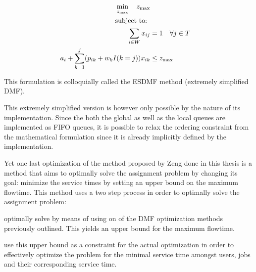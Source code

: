 \documentclass{seal_thesis}
\begin{document}
\begin{align}
    \min_{z_{\text{max}}} \quad z_{\text{max}}\\
    \text{subject to: } \notag \\
    \sum_{i \in W} x_{ij} &= 1 \quad \forall j \in T\\
    a_i + \sum_{k=1}^j (p_{ik} + w_k I(k=j))x_{ik} &\leq z_{\text{max}}
\end{align}

This formulation is colloquially called the ESDMF method (extremely simplified DMF).

This extremely simplified version is however only possible by the nature of its implementation. Since the both the global as well as the local queues are implemented as FIFO queues, it is possible to relax the ordering constraint from the mathematical formulation since it is already implicitly defined by the implementation.

Yet one last optimization of the method proposed by Zeng done in this thesis is a method that aims to optimally solve the assignment problem by changing its goal: minimize the service times by setting an upper bound on the maximum flowtime. This method uses a two step process in order to optimally solve the assignment problem:
\begin{enumerate*}
	\item optimally solve by means of using on of the DMF optimization methods previously outlined. This yields an upper bound for the maximum flowtime.
	\item use this upper bound as a constraint for the actual optimization in order to effectively optimize the problem for the minimal service time amongst users, jobs and their corresponding service time.
\end{enumerate*}
\end{document}
